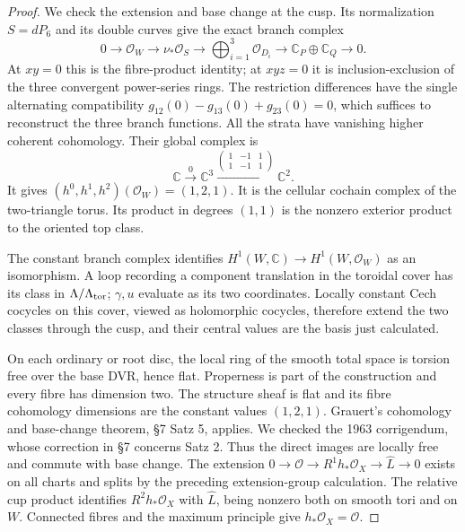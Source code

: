 \begin{proof}
We check the extension and base change at the cusp.  Its normalization
$S=dP_6$ and its double curves give the exact branch complex
\begin{equation}\label{eq:P5normalization}
0\to\mathcal O_W\to\nu_*\mathcal O_S\to
 \bigoplus_{i=1}^3\mathcal O_{D_i}\to
 \mathbb C_P\oplus\mathbb C_Q\to0.
\end{equation}
At $xy=0$ this is the fibre-product identity; at $xyz=0$ it is
inclusion-exclusion of the three convergent power-series rings.  The
restriction differences have the single alternating compatibility
$g_{12}(0)-g_{13}(0)+g_{23}(0)=0$, which suffices to reconstruct the
three branch functions.  All the strata have vanishing higher coherent
cohomology.  Their global complex is
\[
 \mathbb C\xrightarrow{0}\mathbb C^3
 \xrightarrow{\left(\begin{smallmatrix}1&-1&1\\1&-1&1\end{smallmatrix}\right)}
 \mathbb C^2.
\]
It gives $(h^0,h^1,h^2)(\mathcal O_W)=(1,2,1)$.  It is the cellular
cochain complex of the two-triangle torus.  Its product in degrees
$(1,1)$ is the nonzero exterior product to the oriented top class.

The constant branch complex identifies
$H^1(W,\mathbb C)\to H^1(W,\mathcal O_W)$ as an isomorphism.  A loop
recording a component translation in the toroidal cover has its class
in $\Lambda/\Lambda_{\rm tor}$; $\gamma,u$ evaluate as its two
coordinates.  Locally constant Cech cocycles on this cover, viewed as
holomorphic cocycles, therefore extend the two classes through the
cusp, and their central values are the basis just calculated.

On each ordinary or root disc, the local ring of the smooth total
space is torsion free over the base DVR, hence flat.  Properness is part
of the construction and every fibre has dimension two.  The structure
sheaf is flat and its fibre cohomology dimensions are the constant
values $(1,2,1)$.  Grauert's cohomology and base-change theorem, \S7
Satz 5, applies.  We checked the 1963 corrigendum, whose correction in
\S7 concerns Satz 2.  Thus the direct images are locally free and commute
with base change.  The extension
$0\to\mathcal O\to R^1h_*\mathcal O_X\to\widehat L\to0$ exists on all
charts and splits by the preceding extension-group calculation.  The
relative cup product identifies $R^2h_*\mathcal O_X$ with $\widehat L$,
being nonzero both on smooth tori and on $W$.  Connected fibres and the
maximum principle give $h_*\mathcal O_X=\mathcal O$.


\end{proof}
